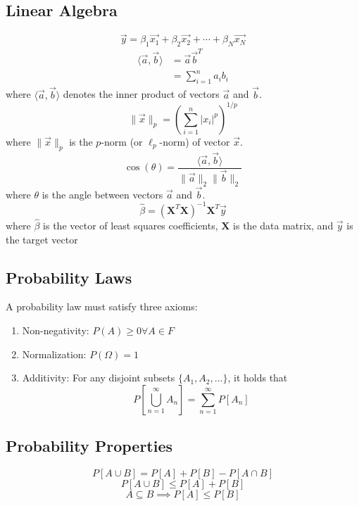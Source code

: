 \subsection{Linear Algebra}
\begin{equation}
    \vec{y} = \beta_1 \vec{x_1} + \beta_2 \vec{x_2} + \cdots + \beta_N \vec{x_N}
\end{equation}
\begin{align}
    \langle \vec{a}, \vec{b} \rangle & = \vec{a}\vec{b}^{T}     \\
                                     & = \sum_{i=1}^{n} a_i b_i
\end{align}
where $\langle \vec{a}, \vec{b} \rangle$ denotes the inner product of vectors $\vec{a}$ and $\vec{b}$.
\begin{equation}
    \|\vec{x}\|_p = \left( \sum_{i=1}^{n} |x_i|^p \right)^{1/p}
\end{equation}
where $\|\vec{x}\|_p$ is the $p$-norm (or $\ell_p$-norm) of vector $\vec{x}$.
\begin{equation}
    \cos(\theta) = \frac{\langle \vec{a}, \vec{b} \rangle}{\|\vec{a}\|_2 \|\vec{b}\|_2}
\end{equation}
where $\theta$ is the angle between vectors $\vec{a}$ and $\vec{b}$.
\begin{equation}
    \hat{\beta} = (\mathbf{X}^T \mathbf{X})^{-1} \mathbf{X}^T \vec{y}
\end{equation}
where $\hat{\beta}$ is the vector of least squares coefficients, $\mathbf{X}$ is the data matrix, and $\vec{y}$ is the target vector

\subsection{Probability Laws}
A probability law must satisfy three axioms:
\begin{enumerate}
    \item Non-negativity: $P(A) \geq 0 \forall A \in F$
    \item Normalization: $P(\Omega) = 1$
    \item Additivity: For any disjoint subsets $\{A_1, A_2, \dots\}$,
          it holds that
          \[P\left[\bigcup_{n=1}^{\infty}A_n\right] = \sum_{n=1}^{\infty}P\left[A_n\right]\]
\end{enumerate}

\subsection{Probability Properties}
\begin{equation}
    P\left[A \cup B\right] = P\left[A\right] + P\left[B\right] - P\left[A \cap B\right]
\end{equation}
\begin{equation}
    P\left[A \cup B\right] \leq P\left[A\right] + P\left[B\right]
\end{equation}
\begin{equation}
    A \subseteq B \implies P\left[A\right] \leq P\left[B\right]
\end{equation}